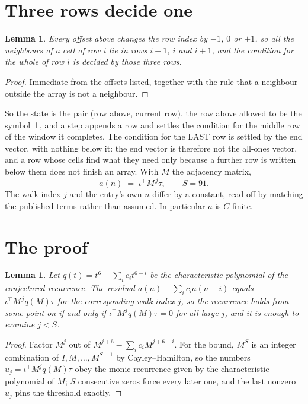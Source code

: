 \documentclass[11pt,a4paper]{article}
\theoremstyle{plain}
\newtheorem{lemma}[theorem]{Lemma}
\theoremstyle{definition}
\begin{document}
\section{Three rows decide one}

\begin{lemma}\label{lem:win}
Every offset above changes the row index by $-1$, $0$ or $+1$, so all the neighbours of a cell
of row $i$ lie in rows $i-1$, $i$ and $i+1$, and the condition for the whole of row $i$ is
decided by those three rows.
\end{lemma}

\begin{proof}
Immediate from the offsets listed, together with the rule that a neighbour outside the array is
not a neighbour.
\end{proof}

So the state is the pair (row above, current row), the row above allowed to be the symbol
$\bot$, and a step appends a row and settles the condition for the middle row of the window it
completes. The condition for the LAST row is settled by the end vector, with nothing below it:
the end vector is therefore not the all-ones vector, and a row whose cells find what they need
only because a further row is written below them does not finish an array. With $M$ the
adjacency matrix,
\[
a(n)\;=\;\iota^{\!\top}M^{\,j}\tau ,\qquad S=91.
\]
The walk index $j$ and the entry's own $n$ differ by a constant, read off by matching the
published terms rather than assumed. In particular $a$ is $C$-finite.

\section{The proof}

\begin{lemma}\label{lem:crit}
Let $q(t)=t^{6}-\sum_i c_it^{6-i}$ be the characteristic polynomial of the
conjectured recurrence. The residual $a(n)-\sum_ic_ia(n-i)$ equals
$\iota^{\!\top}M^{\,j}q(M)\tau$ for the corresponding walk index $j$, so the recurrence
holds from some point on if and only if $\iota^{\!\top}M^{j}q(M)\tau=0$ for all large $j$,
and it is enough to examine $j<S$.
\end{lemma}

\begin{proof}
Factor $M^{j}$ out of $M^{j+6}-\sum_ic_iM^{j+6-i}$. For the bound, $M^{S}$
is an integer combination of $I,M,\dots,M^{S-1}$ by Cayley--Hamilton, so the numbers
$u_j=\iota^{\!\top}M^{j}q(M)\tau$ obey the monic recurrence given by the characteristic
polynomial of $M$; $S$ consecutive zeros force every later one, and the last nonzero $u_j$
pins the threshold exactly.
\end{proof}
\end{document}
